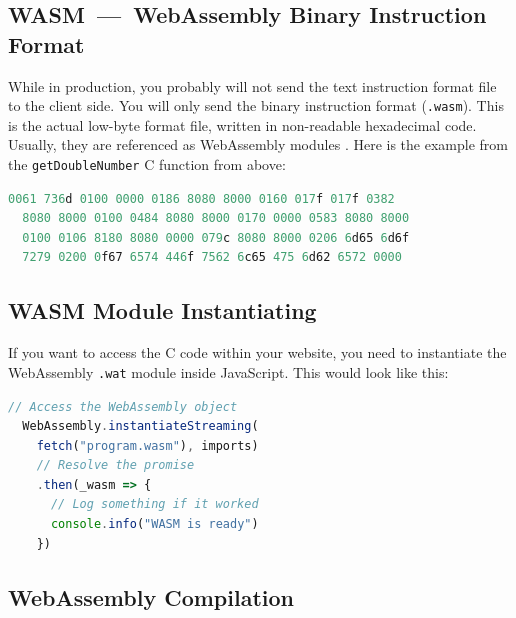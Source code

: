\documentclass[10pt]{article}
\begin{document}
\begin{sloppypar}
  \subsection{WASM~—~WebAssembly Binary Instruction Format}
  \label{sec:webassembly-binary-instruction-format}

  While in production, you probably will not send the text instruction format file to the client side. You will only send the binary instruction format (\lstinline{.wasm}). This is the actual low-byte format file, written in non-readable hexadecimal code. Usually, they are referenced as WebAssembly modules \citep{mozilla_webassembly_2023}. Here is the example from the \lstinline{getDoubleNumber} C function from above:

  \vspace{7pt}
  \begin{lstlisting}[language=C, caption=Code example from above compiled into the WebAssembly \\ Binary Instruction Format., label=lst:binary-example]
  0061 736d 0100 0000 0186 8080 8000 0160 017f 017f 0382
  8080 8000 0100 0484 8080 8000 0170 0000 0583 8080 8000
  0100 0106 8180 8080 0000 079c 8080 8000 0206 6d65 6d6f
  7279 0200 0f67 6574 446f 7562 6c65 475 6d62 6572 0000\end{lstlisting}

  \subsection{WASM Module Instantiating}
  \label{sec:webassembly-module-instantiating}

  If you want to access the C code within your website, you need to instantiate the WebAssembly \lstinline{.wat} module inside JavaScript. This would look like this:

  \vspace{7pt}
  \begin{lstlisting}[language=JavaScript, caption=Instantiate the \lstinline{.wasm} module in JavaScript., label=lst:javascript-example]
  // Access the WebAssembly object
  WebAssembly.instantiateStreaming(
    fetch("program.wasm"), imports)
    // Resolve the promise
    .then(_wasm => {
      // Log something if it worked
      console.info("WASM is ready")
    })\end{lstlisting}

  \subsection{WebAssembly Compilation}
  \label{sec:webassembly-compilation}


\end{sloppypar}
\end{document}

